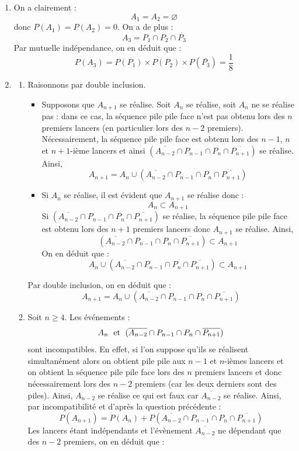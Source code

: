 \documentclass[a4paper,twoside,french,10pt]{VcCours}
\begin{document}
\begin{enumerate}
\item On a clairement :
$$ A_1=A_2= \varnothing$$
donc $P(A_1)=P(A_2)=0$. On a de plus :
$$ A_3 = P_1 \cap P_2 \cap \overline{P_3}$$
Par mutuelle indépendance, on en déduit que :
$$ P(A_3) = P(P_1) \times P(P_2) \times P(\overline{P_3}) = \dfrac{1}{8}$$
\item 
\begin{enumerate}
\item Raisonnons par double inclusion.
\begin{itemize}
\item Supposons que $A_{n+1}$ se réalise. Soit $A_n$ se réalise, soit $A_n$ ne se réalise pas : dans ce cas, la séquence pile pile face n'est pas obtenu lors des $n$ premiers lancers (en particulier lors des $n-2$ premiers). Nécessairement, la séquence pile pile face est obtenu lors des $n-1$, $n$ et $n+1$-ième lancers et ainsi $(\overline{A_{n-2}} \cap P_{n-1} \cap P_n \cap \overline{P_{n+1}})$ se réalise. Ainsi,
$$ A_{n+1} = A_n  \cup (\overline{A_{n-2}} \cap P_{n-1} \cap P_n \cap \overline{P_{n+1}})$$
\item Si $A_n$ se réalise, il est évident que $A_{n+1}$ se réalise donc :
$$ A_n \subset A_{n+1}$$
Si $(\overline{A_{n-2}} \cap P_{n-1} \cap P_n \cap \overline{P_{n+1}})$ se réalise, la séquence pile pile face est obtenu lors des $n+1$ premiers lancers donc $A_{n+1}$ se réalise. Ainsi,
$$ (\overline{A_{n-2}} \cap P_{n-1} \cap P_n \cap \overline{P_{n+1}}) \subset A_{n+1}$$
On en déduit que :
$$ A_n \cup (\overline{A_{n-2}} \cap P_{n-1} \cap P_n \cap \overline{P_{n+1}})\subset A_{n+1}$$
\end{itemize}
Par double inclusion, on en déduit que :
$$A_{n+1} = A_n  \cup (\overline{A_{n-2}} \cap P_{n-1} \cap P_n \cap \overline{P_{n+1}})$$
\item Soit $n \geq 4$. Les événements :
$$  A_n  \; \hbox{ et } \;  (\overline{A_{n-2}} \cap P_{n-1} \cap P_n \cap \overline{P_{n+1}})$$
sont incompatibles. En effet, si l'on suppose qu'ils se réalisent simultanément alors on obtient pile pile aux $n-1$ et $n$-ièmes lancers et on obtient la séquence pile pile face lors des $n$ premiers lancers et donc nécessairement lors des $n-2$ premiers (car les deux derniers sont des piles). Ainsi, $A_{n-2}$ se réalise ce qui est faux car $\overline{A_{n-2}}$ se réalise. Ainsi, par incompatibilité et d'après la question précédente :
$$ P(A_{n+1}) = P(A_n) +   P(\overline{A_{n-2}} \cap P_{n-1} \cap P_n \cap \overline{P_{n+1}})$$
Les lancers étant indépendants et l'évènement $\overline{A_{n-2}}$ ne dépendant que des $n-2$ premiers, on en déduit que :

\end{enumerate}
\end{enumerate}
\end{document}
